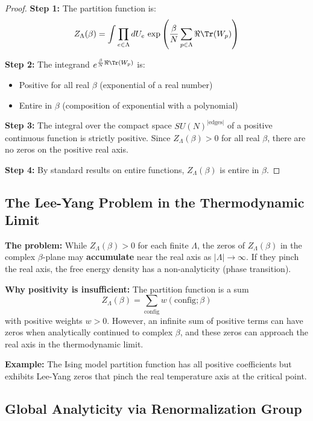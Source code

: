 \begin{proof}
\textbf{Step 1:} The partition function is:
\[
Z_\Lambda(\beta) = \int \prod_{e \in \Lambda} dU_e \, \exp\left(\frac{\beta}{N} \sum_{p \in \Lambda} \Re\Tr(W_p)\right)
\]

\textbf{Step 2:} The integrand $e^{\frac{\beta}{N} \Re\Tr(W_p)}$ is:
\begin{itemize}
    \item Positive for all real $\beta$ (exponential of a real number)
    \item Entire in $\beta$ (composition of exponential with a polynomial)
\end{itemize}

\textbf{Step 3:} The integral over the compact space $SU(N)^{|\text{edges}|}$ of a positive continuous function is strictly positive. Since $Z_\Lambda(\beta) > 0$ for all real $\beta$, there are no zeros on the positive real axis.

\textbf{Step 4:} By standard results on entire functions, $Z_\Lambda(\beta)$ is entire in $\beta$.
\end{proof}

\subsection{The Lee-Yang Problem in the Thermodynamic Limit}

\begin{tcolorbox}[colback=red!5!white, colframe=red!75!black, title=\textbf{Critical Mathematical Issue}]
\textbf{The problem:} While $Z_\Lambda(\beta) > 0$ for each finite $\Lambda$, the zeros of $Z_\Lambda(\beta)$ in the complex $\beta$-plane may \textbf{accumulate} near the real axis as $|\Lambda| \to \infty$. If they pinch the real axis, the free energy density has a non-analyticity (phase transition).

\textbf{Why positivity is insufficient:} The partition function is a sum
\[
Z_\Lambda(\beta) = \sum_{\text{config}} w(\text{config}; \beta)
\]
with positive weights $w > 0$. However, an infinite sum of positive terms can have zeros when analytically continued to complex $\beta$, and these zeros can approach the real axis in the thermodynamic limit.

\textbf{Example:} The Ising model partition function has all positive coefficients but exhibits Lee-Yang zeros that pinch the real temperature axis at the critical point.
\end{tcolorbox}

\subsection{Global Analyticity via Renormalization Group}

